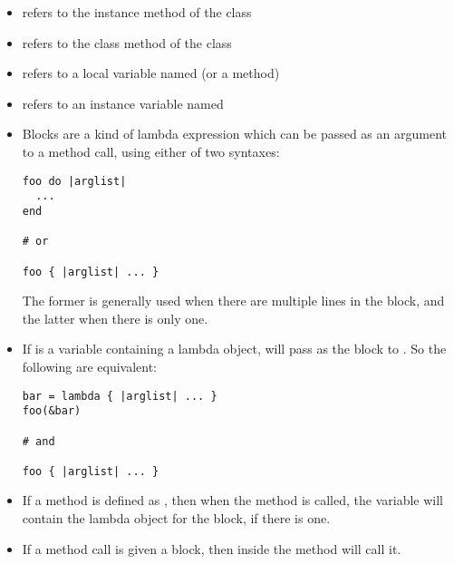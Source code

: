 \begin{itemize}
  \item {} refers to the instance method  of the class 
  
  \item {} refers to the class method  of the class 
  
  \item {} refers to a local variable named  (or a method)
  
  \item {} refers to an instance variable named 
  
  \item Blocks are a kind of lambda expression which can be passed as an argument to a method call, using either of two syntaxes:
\begin{lstlisting}
foo do |arglist|
  ...
end

# or

foo { |arglist| ... }
\end{lstlisting}
  
  The former is generally used when there are multiple lines in the block, and the latter when there is only one.
  \item If  is a variable containing a lambda object,  will pass  as the block to . So the following are equivalent:
\begin{lstlisting}
bar = lambda { |arglist| ... }
foo(&bar)

# and

foo { |arglist| ... }
\end{lstlisting}
  \item If a method is defined as , then when the method is called, the  variable will contain the lambda object for the block, if there is one.
  
  \item If a method call is given a block, then  inside the method will call it.
\end{itemize}
